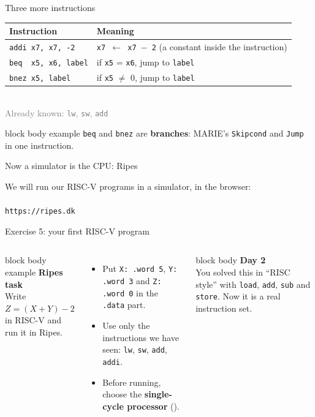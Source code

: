 \documentclass[aspectratio=169,10pt]{beamer}
\newcommand{\stepbox}[2]{%
  \begin{beamercolorbox}[rounded=true,sep=0.09cm,wd=\linewidth]{block body}
    \footnotesize\textbf{#1}\\ #2
  \end{beamercolorbox}\vspace{0.06cm}}
\newcommand{\taskhead}[2]{%
  \begin{beamercolorbox}[rounded=true,sep=0.12cm,wd=\linewidth]{block body example}
    \small\textbf{#1}\\[0.04cm]
    \footnotesize #2
  \end{beamercolorbox}\vspace{0.1cm}}
\newcommand{\keymsg}[1]{%
  \begin{beamercolorbox}[rounded=true,sep=0.1cm,wd=\textwidth]{block body example}
    \centering\footnotesize #1
  \end{beamercolorbox}}
\newcommand{\mo}[2]{\texttt{#1\,$\leftarrow$\,#2}}
\begin{document}
\begin{frame}{Three more instructions}
  \begin{center}
    \small
    \renewcommand{\arraystretch}{1.5}
    \begin{tabular}{ll}
      \toprule
      Instruction & Meaning \\
      \midrule
      \texttt{addi x7, x7, -2} & \mo{x7}{x7 $-$ 2} \quad (a constant inside the instruction) \\
      \texttt{beq\ \ x5, x6, label} & if \texttt{x5} = \texttt{x6}, jump to \texttt{label} \\
      \texttt{bnez x5, label} & if \texttt{x5} $\neq$ 0, jump to \texttt{label} \\
      \bottomrule
    \end{tabular}\\[0.3cm]
    \footnotesize\textcolor{gray}{Already known: \texttt{lw}, \texttt{sw}, \texttt{add}}
  \end{center}
  \vfill
  \keymsg{\texttt{beq} and \texttt{bnez} are \textbf{branches}: MARIE's \texttt{Skipcond} and \texttt{Jump} in one instruction.}
\end{frame}

\begin{frame}{Now a simulator is the CPU: Ripes}
  \begin{center}
    \small We will run our RISC-V programs in a simulator, in the browser:\\[0.6cm]
    {\Huge\textcolor{DeepBlue}{\faGlobe}}\\[0.3cm]
    \LARGE\texttt{https://ripes.dk}
  \end{center}
\end{frame}

\begin{frame}{Exercise 5: your first RISC-V program}
  \begin{columns}[T,onlytextwidth]
      \taskhead{Ripes task}{Write $Z = (X + Y) - 2$ in RISC-V and run it in Ripes.}
      \footnotesize
      \begin{itemize}\setlength{\itemsep}{3pt}
        \item Put \texttt{X: .word 5}, \texttt{Y: .word 3} and \texttt{Z: .word 0} in the \texttt{.data} part.
        \item Use only the instructions we have seen: \texttt{lw}, \texttt{sw}, \texttt{add}, \texttt{addi}.
        \item Before running, choose the \textbf{single-cycle processor} (\textcolor{DeepBlue}{\faMicrochip}).
      \end{itemize}
      \stepbox{Day 2}{You solved this in ``RISC style'' with \texttt{load}, \texttt{add}, \texttt{sub} and \texttt{store}.
        Now it is a real instruction set.}
  \end{columns}
\end{frame}
\end{document}
